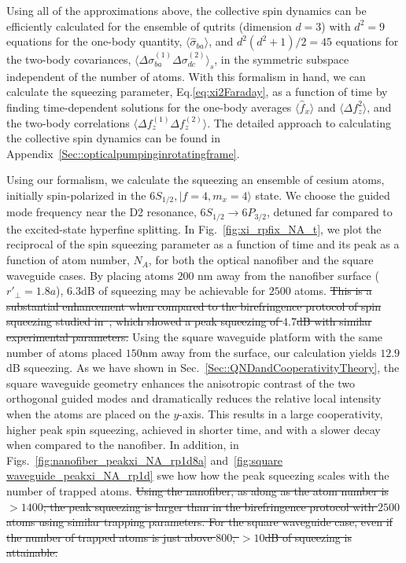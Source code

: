 \documentclass[preprint,aps,pra,onecolumn,superscriptaddress]{revtex4-1} %
\def\ket#1{\lvert{#1}\rangle}%
\newcommand{\expect}[1]{\big\langle #1 \big\rangle}
\begin{document}
Using all of the approximations above, the collective spin dynamics can be efficiently calculated for the ensemble of qutrits (dimension  $d=3$) with $ d^2=9 $ equations for the one-body quantity, $ \expect{\hat{\sigma}_{ba}} $, and $ d^2(d^2+1)/2=45 $ equations for the two-body covariances, $ \expect{\Delta \sigma_{ba}^{(1)}\Delta\sigma_{dc}^{(2)} }_s $, in the symmetric subspace independent of the number of atoms.  With this formalism in hand, we can calculate the squeezing parameter, Eq.\eqref{eq:xi2Faraday}, as a function of time by finding time-dependent solutions for the one-body averages $\expect{\hat{f}_x}$ and  $\expect{\Delta f_z^2}$, and the two-body correlations $\expect{\Delta f_z^{(1)} \Delta f_z^{(2)}}$.  The detailed approach to calculating the collective spin dynamics can be found in Appendix~\ref{Sec::opticalpumpinginrotatingframe}. 

{\color{blue} Using our formalism, we calculate the squeezing an ensemble of cesium atoms, initially spin-polarized in the $6S_{1/2},\ket{f=4, m_x=4}$ state.  We choose the guided mode frequency near the D2 resonance, $6S_{1/2}\rightarrow 6P_{3/2}$, detuned far compared to the excited-state hyperfine splitting.} In Fig.~\ref{fig:xi_rpfix_NA_t}, we plot the reciprocal of the spin squeezing parameter as a function of time and its peak as a function of atom number, $ N_A $, for both the optical nanofiber and the square waveguide cases. By placing atoms $ 200$ nm away from the nanofiber surface ($ r'\!_\perp=1.8a $), $ 6.3 $dB of squeezing may be achievable for $ 2500 $ atoms. {\color{red} \sout{This is a substantial enhancement when compared to the birefringence protocol of spin squeezing  studied in~\cite{Qi2016}, which showed a peak squeezing  of $ 4.7 $dB with  similar experimental parameters.}} Using the square waveguide platform with the same number of atoms placed $150 $nm away from the surface, our calculation yields $12.9$dB squeezing. As we have shown in Sec.~\ref{Sec::QNDandCooperativityTheory}, the square waveguide geometry enhances the anisotropic contrast of the two orthogonal guided modes and dramatically reduces the relative local intensity when the atoms are placed on the $ y $-axis. This results in a large cooperativity, higher peak spin squeezing, achieved in shorter time, and with a slower decay when compared to the nanofiber. {\color{blue} In addition, in Figs.~\ref{fig:nanofiber_peakxi_NA_rp1d8a} and~\ref{fig:square waveguide_peakxi_NA_rp1d} swe how how the peak squeezing scales with the number of trapped atoms. }{\color{red} \sout{Using the nanofiber, as along as the atom number is  $>1400 $, the peak  squeezing  is larger than in the birefringence protocol with $ 2500 $ atoms using similar trapping parameters. For the square waveguide case, even if the number of trapped atoms is just above $ 800 $, $ >10 $dB of  squeezing is attainable.}} 
\end{document}
